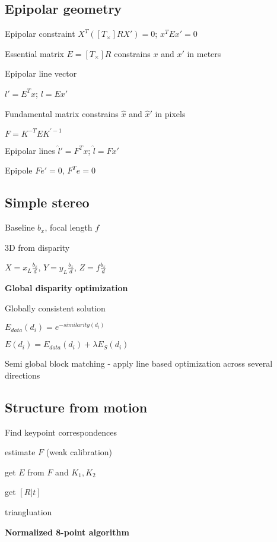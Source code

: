 \documentclass{article}
\begin{document}
\begin{multicols*}{2}
{\subsection{Epipolar geometry}

Epipolar constraint $X^T([T_\times]RX') = 0$; $x^T E x' = 0$

Essential matrix $E=[T_\times] R$ constrains $x$ and $x'$ in meters

Epipolar line vector

$l' = E^Tx$;
$l = Ex'$

Fundamental matrix constrains $\hat{x}$ and $\hat{x}'$ in pixels

$ F = K^{-T}EK^{'-1}$

Epipolar lines
$\hat{l}' = F^Tx$;
$\hat{l} = Fx'$


Epipole $Fe' = 0$, $F^Te = 0$

\subsection{Simple stereo}

Baseline $b_x$, focal length $f$

3D from disparity

$X = x_L \frac{b_x}{d}$, $Y = y_L \frac{b_x}{d}$, $Z = f \frac{b_x}{d}$

\textbf{Global disparity optimization}

Globally consistent solution

$E_{data}(d_i) = e^{-similarity(d_i)}$

$E(d_i) = E_{data}(d_i) + \lambda E_S(d_i)$

Semi global block matching - apply line based optimization across several directions

\subsection{Structure from motion}

\begin{compactenum}
	\item Find keypoint correspondences
	\item estimate $F$ (weak calibration)
	\item get $E$ from $F$ and $K_1, K_2$
	\item get $[R | t]$
	\item triangluation
\end{compactenum}

\textbf{Normalized 8-point algorithm}

}
\end{multicols*}
\end{document}
